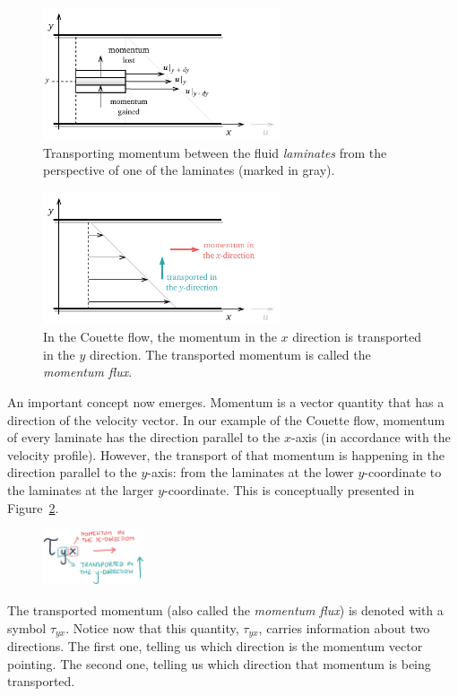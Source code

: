 \documentclass[10pt,twocolumn]{article}
\begin{document}
\begin{figure}[H]
\centering\includegraphics[width=7cm]{momentum-transport-in-laminates.pdf}
\caption{Transporting momentum between the fluid \textit{laminates} from the perspective of one of the laminates (marked in gray).}
\label{fig:momentum-transport-in-laminates}
\end{figure}
\begin{figure}[H]
\centering\includegraphics[width=7cm]{couette-flow-momentum-transport.pdf}
\caption{In the Couette flow, the momentum in the $x$ direction is transported in the $y$ direction. The transported momentum is called the \textit{momentum flux}.}
\label{fig:couette-flow-momentum-transport}
\end{figure}
An important concept now emerges. Momentum is a vector quantity that has a direction of the velocity vector. In our example of the Couette flow, momentum of every laminate has the direction parallel to the $x$-axis (in accordance with the velocity profile). However, the transport of that momentum is happening in the direction parallel to the $y$-axis: from the laminates at the lower $y$-coordinate to the laminates at the larger $y$-coordinate. This is conceptually presented in Figure~\ref{fig:couette-flow-momentum-transport}. 

\begin{figure}
\centering\includegraphics[width=3cm]{tau_y_x.png}
\label{fig:tau_y_x}
\end{figure}
The transported momentum (also called the \textit{momentum flux}) is denoted with a symbol $\tau_{yx}$. Notice now that this quantity, $\tau_{yx}$, carries information about two directions. The first one, telling us which direction is the momentum vector pointing. The second one, telling us which direction that momentum is being transported.
\end{document}
